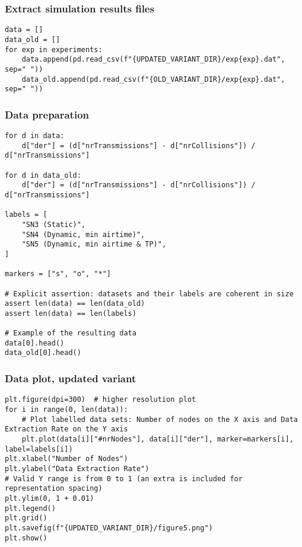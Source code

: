 \documentclass[a4paper,11pt]{article} %
\begin{document}
    \subsubsection*{Extract simulation results files}

    \begin{verbatim}
data = []
data_old = []
for exp in experiments:
    data.append(pd.read_csv(f"{UPDATED_VARIANT_DIR}/exp{exp}.dat", sep=" "))
    data_old.append(pd.read_csv(f"{OLD_VARIANT_DIR}/exp{exp}.dat", sep=" "))
    \end{verbatim}

    \subsubsection*{Data preparation}

    \begin{verbatim}
for d in data:
    d["der"] = (d["nrTransmissions"] - d["nrCollisions"]) / d["nrTransmissions"]

for d in data_old:
    d["der"] = (d["nrTransmissions"] - d["nrCollisions"]) / d["nrTransmissions"]

labels = [
    "SN3 (Static)",
    "SN4 (Dynamic, min airtime)",
    "SN5 (Dynamic, min airtime & TP)",
]

markers = ["s", "o", "*"]

# Explicit assertion: datasets and their labels are coherent in size
assert len(data) == len(data_old)
assert len(data) == len(labels)

# Example of the resulting data
data[0].head()
data_old[0].head()
    \end{verbatim}

    \subsubsection*{Data plot, updated variant}

    \begin{verbatim}
plt.figure(dpi=300)  # higher resolution plot
for i in range(0, len(data)):
    # Plot labelled data sets: Number of nodes on the X axis and Data Extraction Rate on the Y axis
    plt.plot(data[i]["#nrNodes"], data[i]["der"], marker=markers[i], label=labels[i])
plt.xlabel("Number of Nodes")
plt.ylabel("Data Extraction Rate")
# Valid Y range is from 0 to 1 (an extra is included for representation spacing)
plt.ylim(0, 1 + 0.01)
plt.legend()
plt.grid()
plt.savefig(f"{UPDATED_VARIANT_DIR}/figure5.png")
plt.show()
    \end{verbatim}
\end{document}
